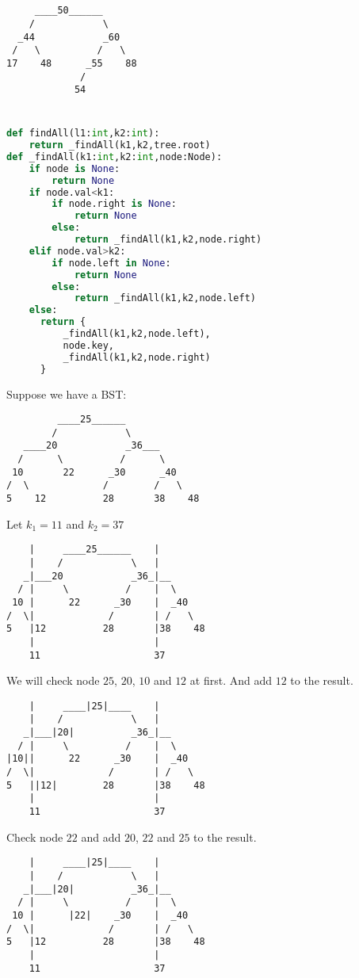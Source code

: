 \documentclass{article}
\begin{document}
\subsection{}
\begin{lstlisting}
     ____50______
    /            \
  _44            _60
 /   \          /   \
17    48      _55    88
             /
            54
\end{lstlisting}
\section{}
\begin{lstlisting}[language=Python]
def findAll(l1:int,k2:int):
    return _findAll(k1,k2,tree.root)
def _findAll(k1:int,k2:int,node:Node):
    if node is None:
        return None
    if node.val<k1:
        if node.right is None:
            return None
        else:
            return _findAll(k1,k2,node.right)
    elif node.val>k2:
        if node.left in None:
            return None
        else:
            return _findAll(k1,k2,node.left)
    else:
      return {
          _findAll(k1,k2,node.left),
          node.key,
          _findAll(k1,k2,node.right)  
      }
\end{lstlisting}
Suppose we have a BST:
\begin{lstlisting}
         ____25______
        /            \
   ____20            _36___
  /      \          /      \
 10       22      _30      _40
/  \             /        /   \
5    12          28       38    48
\end{lstlisting}
Let $k_1=11$ and $k_2=37$
\begin{lstlisting}
    |     ____25______    |
    |    /            \   |
   _|___20            _36_|__
  / |     \          /    |  \
 10 |      22      _30    |  _40
/  \|             /       | /   \
5   |12          28       |38    48
    |                     |
    11                    37
\end{lstlisting}
We will check node $25$, $20$, $10$ and $12$ at first. And add $12$ to the result.
\begin{lstlisting}
    |     ____|25|____    |
    |    /            \   |
   _|___|20|          _36_|__
  / |     \          /    |  \
|10||      22      _30    |  _40
/  \|             /       | /   \
5   ||12|        28       |38    48
    |                     |
    11                    37
\end{lstlisting}
Check node $22$ and add $20$, $22$ and $25$ to the result.
\begin{lstlisting}
    |     ____|25|____    |
    |    /            \   |
   _|___|20|          _36_|__
  / |     \          /    |  \
 10 |      |22|    _30    |  _40
/  \|             /       | /   \
5   |12          28       |38    48
    |                     |
    11                    37
\end{lstlisting}
\end{document}
